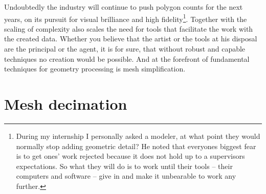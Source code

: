 Undoubtedly the industry will continue to push polygon counts for the next years, on its pursuit for visual brilliance and high fidelity\footnote{ During my internship I personally asked a modeler, at what point they would normally stop adding geometric detail? He noted that everyones biggest fear is to get ones' work rejected because it does not hold up to a supervisors expectations. So what they will do is to work until their tools -- their computers and software -- give in and make it unbearable to work any further.}.
Together with the scaling of complexity also scales the need for tools that facilitate the work with the created data.
Whether you believe that the artist or the tools at his disposal are the principal or the agent, it is for sure, that without robust and capable techniques no creation would be possible.
And at the forefront of fundamental techniques for geometry processing is mesh simplification.

\section{Mesh decimation}
\label{introduction3}

